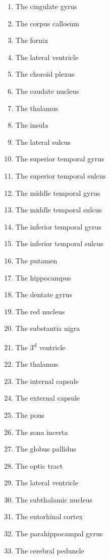\documentclass[]{book}
\providecommand{\tightlist}{%
  \setlength{\itemsep}{0pt}\setlength{\parskip}{0pt}}
\begin{document}
\begin{enumerate}
\def\labelenumi{\arabic{enumi}.}
\tightlist
\item
  The cingulate gyrus
\item
  The corpus callosum
\item
  The fornix
\item
  The lateral ventricle
\item
  The choroid plexus
\item
  The caudate nucleus
\item
  The thalamus
\item
  The insula
\item
  The lateral sulcus
\item
  The superior temporal gyrus
\item
  The superior temporal sulcus
\item
  The middle temporal gyrus
\item
  The middle temporal sulcus
\item
  The inferior temporal gyrus
\item
  The inferior temporal sulcus
\item
  The putamen
\item
  The hippocampus
\item
  The dentate gyrus
\item
  The red nucleus
\item
  The substantia nigra
\item
  The 3\textsuperscript{d} ventricle
\item
  The thalamus
\item
  The internal capsule
\item
  The external capsule
\item
  The pons
\item
  The zona incerta
\item
  The globus pallidus
\item
  The optic tract
\item
  The lateral ventricle
\item
  The subthalamic nucleus
\item
  The entorhinal cortex
\item
  The parahippocampal gyrus
\item
  The cerebral peduncle
\end{enumerate}
\end{document}
